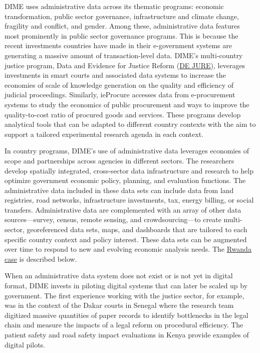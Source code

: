DIME uses administrative data across its thematic programs: economic transformation, public sector governance, infrastructure and climate change, fragility and conflict, and gender. Among these, administrative data features most prominently in public sector governance programs. This is because the recent investments countries have made in their e-government systems are generating a massive amount of transaction-level data. DIME's multi-country justice program, Data and Evidence for Justice Reform (\href{http://pubdocs.worldbank.org/en/923891592406548876/DE-JURE-Brief.pdf}{DE JURE}), leverages investments in smart courts and associated data systems to increase the economies of scale of knowledge generation on the quality and efficiency of judicial proceedings. Similarly, ieProcure accesses data from e-procurement systems to study the economics of public procurement and ways to improve the quality-to-cost ratio of procured goods and services. These programs develop analytical tools that can be adapted to different country contexts with the aim to support a tailored experimental research agenda in each context.

In country programs, DIME's use of administrative data leverages economies of scope and partnerships across agencies in different sectors. The researchers develop spatially integrated, cross-sector data infrastructure and research to help optimize government economic policy, planning, and evaluation functions. The administrative data included in these data sets can include data from land registries, road networks, infrastructure investments, tax, energy billing, or social transfers. Administrative data are complemented with an array of other data sources---survey, census, remote sensing, and crowdsourcing---to create multi-sector, georeferenced data sets, maps, and dashboards that are tailored to each specific country context and policy interest. These data sets can be augmented over time to respond to new and evolving economic analysis needs. The \href{http://pubdocs.worldbank.org/en/703511592406882534/Rwanda-Program-Brief.pdf}{Rwanda case} is described below.

When an administrative data system does not exist or is not yet in digital format, DIME invests in piloting digital systems that can later be scaled up by government. The first experience working with the justice sector, for example, was in the context of the Dakar courts in Senegal where the research team digitized massive quantities of paper records to identify bottlenecks in the legal chain and measure the impacts of a legal reform on procedural efficiency. The patient safety and road safety impact evaluations in Kenya provide examples of digital pilots.

